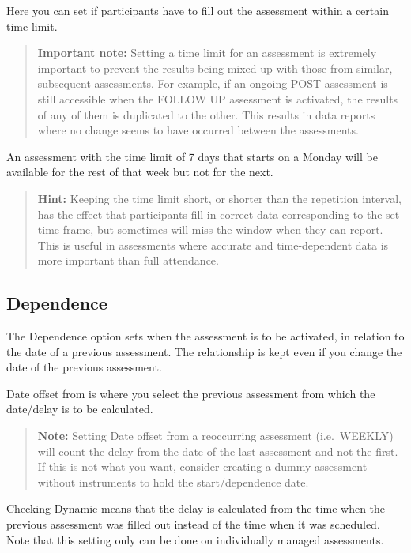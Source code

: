 \documentclass[]{book}
\begin{document}
Here you can set if participants have to fill out the assessment within a certain time limit.

\begin{quote}
\textbf{Important note:} Setting a time limit for an assessment is extremely important to prevent the results being mixed up with those from similar, subsequent assessments. For example, if an ongoing POST assessment is still accessible when the FOLLOW UP assessment is activated, the results of any of them is duplicated to the other. This results in data reports where no change seems to have occurred between the assessments.
\end{quote}

An assessment with the time limit of 7 days that starts on a Monday will be available for the rest of that week but not for the next.

\begin{quote}
\textbf{Hint:} Keeping the time limit short, or shorter than the repetition interval, has the effect that participants fill in correct data corresponding to the set time-frame, but sometimes will miss the window when they can report. This is useful in assessments where accurate and time-dependent data is more important than full attendance.
\end{quote}

\hypertarget{dependence}{%
\subsection{Dependence}\label{dependence}}

The Dependence option sets when the assessment is to be activated, in relation to the date of a previous assessment. The relationship is kept even if you change the date of the previous assessment.

Date offset from is where you select the previous assessment from which the date/delay is to be calculated.

\begin{quote}
\textbf{Note:} Setting Date offset from a reoccurring assessment (i.e.~WEEKLY) will count the delay from the date of the last assessment and not the first. If this is not what you want, consider creating a dummy assessment without instruments to hold the start/dependence date.
\end{quote}

Checking Dynamic means that the delay is calculated from the time when the previous assessment was filled out instead of the time when it was scheduled. Note that this setting only can be done on individually managed assessments.
\end{document}
